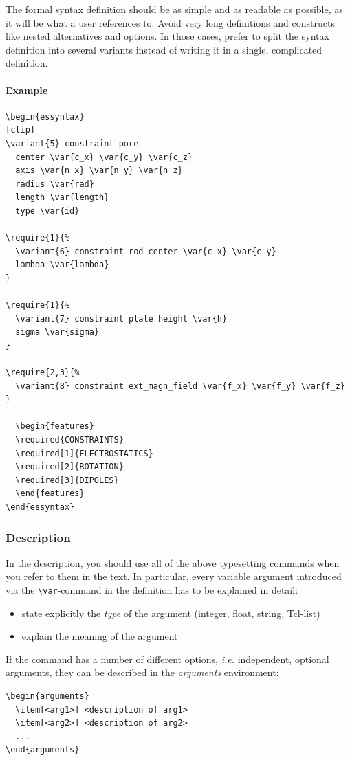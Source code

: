 \documentclass[
a4paper,                        %
11pt,                           %
twoside,                        %
footsepline,                    %
headsepline,                    %
headexclude,                    %
footexclude,                    %
pagesize,                       %
bibtotocnumbered,               %
idxtotoc                        %
]{scrreprt}
\newcommand{\ie}{\textit{i.e.}\xspace}
\begin{document}
The formal syntax definition should be as simple and as readable as
possible, as it will be what a user references to. Avoid very long
definitions and constructs like nested alternatives and options.  In
those cases, prefer to split the syntax definition into several
variants instead of writing it in a single, complicated definition.

\paragraph{Example}
\begin{verbatim}
\begin{essyntax}
[clip]
\variant{5} constraint pore 
  center \var{c_x} \var{c_y} \var{c_z} 
  axis \var{n_x} \var{n_y} \var{n_z} 
  radius \var{rad}
  length \var{length} 
  type \var{id} 

\require{1}{%
  \variant{6} constraint rod center \var{c_x} \var{c_y} 
  lambda \var{lambda}
} 
  
\require{1}{%
  \variant{7} constraint plate height \var{h}
  sigma \var{sigma} 
}
  
\require{2,3}{%
  \variant{8} constraint ext_magn_field \var{f_x} \var{f_y} \var{f_z} 
}

  \begin{features}
  \required{CONSTRAINTS}
  \required[1]{ELECTROSTATICS}
  \required[2]{ROTATION}
  \required[3]{DIPOLES}
  \end{features}
\end{essyntax}
\end{verbatim}

\subsubsection{Description}

In the description, you should use all of the above typesetting
commands when you refer to them in the text.  In particular, every
variable argument introduced via the \verb!\var!-command in the
definition has to be explained in detail:
\begin{itemize}
\item state explicitly the \emph{type} of the argument (integer,
  float, string, Tcl-list)
\item explain the meaning of the argument
\end{itemize}

If the command has a number of different options, \ie independent,
optional arguments, they can be described in the \emph{arguments}
environment:
\begin{verbatim}
\begin{arguments}
  \item[<arg1>] <description of arg1>
  \item[<arg2>] <description of arg2>
  ...
\end{arguments}
\end{verbatim}
\end{document}
